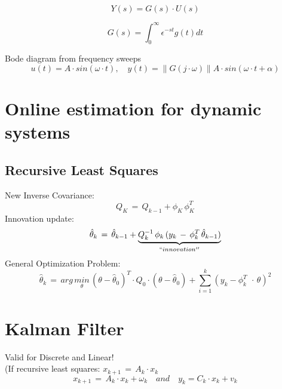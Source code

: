 \begin{equation*}
Y(s)=G(s)\cdot U(s)
\end{equation*}

\begin{equation*}
G(s)=\int _{ 0 }^{ \infty  }{ \epsilon }^{ -st }g(t)dt
\end{equation*}

Bode diagram from frequency sweeps
\begin{equation*}
u(t)=A\cdot sin(\omega \cdot t),\quad y(t)=\parallel G(j\cdot \omega )\parallel A\cdot sin(\omega \cdot t+\alpha )
\end{equation*}


\section*{Online estimation for dynamic systems}
\subsection*{Recursive Least Squares}
New Inverse Covariance:
\begin{equation*}
Q_K \, = \, Q_{k-1} + \phi_K\,\phi_K^T
\end{equation*}
Innovation update:
\begin{equation*}
\hat { \theta  } _{ k }\, =\, \hat { \theta  } _{ k-1 }+\underset { ``innovation'' }{ \underbrace { Q_{ k }^{ -1 }\, \phi _{ k }\, (y_{ k }\, -\, \phi _{ k }^{ T }\, \hat { \theta  } _{ k-1 }) }  } 
\end{equation*}
General Optimization Problem:
\begin{equation*}
\hat { \theta  } _{ k }\, =\, arg\, \underset { \theta  }{ min } \, (\theta -\hat { \theta  } _{ 0 })^{ T }\cdot Q_{ 0 }\cdot (\theta -\hat { \theta  } _{ 0 })+\sum _{ i=1 }^{ k }{ (y_k-\phi_k^T\ \, \cdot \, \theta)^2 } 
\end{equation*}

\section*{Kalman Filter}
Valid for Discrete and Linear!\\
(If recursive least squares: \( x_{ k+1 }\, =\, A_{ k }\cdot x_{ k } \)
\begin{equation*}
x_{ k+1 }\, =\, A_{ k }\cdot x_{ k }+\omega _{ k }\quad and\quad y_{ k }=C_{ k }\cdot x_{ k }+v_{ k }
\end{equation*}
